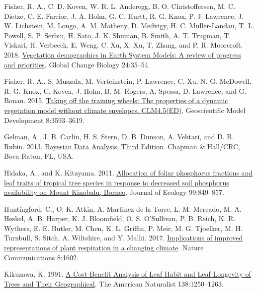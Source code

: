 \documentclass[
  12pt,
  letterpaper,
  DIV=11,
  numbers=noendperiod]{scrartcl}
\newlength{\cslhangindent}
\newlength{\cslentryspacingunit} %
\newenvironment{CSLReferences}[2] %
 {%
  \setlength{\parindent}{0pt}
  \ifodd #1
  \let\oldpar\par
  \def\par{\hangindent=\cslhangindent\oldpar}
  \fi
  \setlength{\parskip}{#2\cslentryspacingunit}
 }%
 {}
\begin{document}
\begin{CSLReferences}{1}{0}
\leavevmode{}%
Fisher, R. A., C. D. Koven, W. R. L. Anderegg, B. O. Christoffersen, M.
C. Dietze, C. E. Farrior, J. A. Holm, G. C. Hurtt, R. G. Knox, P. J.
Lawrence, J. W. Lichstein, M. Longo, A. M. Matheny, D. Medvigy, H. C.
Muller-Landau, T. L. Powell, S. P. Serbin, H. Sato, J. K. Shuman, B.
Smith, A. T. Trugman, T. Viskari, H. Verbeeck, E. Weng, C. Xu, X. Xu, T.
Zhang, and P. R. Moorcroft. 2018.
\href{https://doi.org/10.1111/gcb.13910}{Vegetation demographics in
{Earth System Models}: {A} review of progress and priorities}. Global
Change Biology 24:35--54.

\leavevmode{}%
Fisher, R. A., S. Muszala, M. Verteinstein, P. Lawrence, C. Xu, N. G.
McDowell, R. G. Knox, C. Koven, J. Holm, B. M. Rogers, A. Spessa, D.
Lawrence, and G. Bonan. 2015.
\href{https://doi.org/10.5194/gmd-8-3593-2015}{Taking off the training
wheels: The properties of a dynamic vegetation model without climate
envelopes, {CLM4}.5({ED})}. Geoscientific Model Development
8:3593--3619.

\leavevmode{}%
Gelman, A., J. B. Carlin, H. S. Stern, D. B. Dunson, A. Vehtari, and D.
B. Rubin. 2013.
\href{https://books.google.com.pa/books?id=eSHSBQAAQBAJ}{Bayesian {Data
Analysis}, {Third Edition}}. {Chapman \& Hall/CRC}, {Boca Raton, FL,
USA.}

\leavevmode{}%
Hidaka, A., and K. Kitayama. 2011.
\href{https://doi.org/10.1111/j.1365-2745.2011.01805.x}{Allocation of
foliar phosphorus fractions and leaf traits of tropical tree species in
response to decreased soil phosphorus availability on {Mount Kinabalu},
{Borneo}}. Journal of Ecology 99:849--857.

\leavevmode{}%
Huntingford, C., O. K. Atkin, A. Martinez-de la Torre, L. M. Mercado, M.
A. Heskel, A. B. Harper, K. J. Bloomfield, O. S. O'Sullivan, P. B.
Reich, K. R. Wythers, E. E. Butler, M. Chen, K. L. Griffin, P. Meir, M.
G. Tjoelker, M. H. Turnbull, S. Sitch, A. Wiltshire, and Y. Malhi. 2017.
\href{https://doi.org/10.1038/s41467-017-01774-z}{Implications of
improved representations of plant respiration in a changing climate}.
Nature Communications 8:1602.

\leavevmode{}%
Kikuzawa, K. 1991. \href{https://doi.org/10.2307/2462519}{A
{Cost-Benefit Analysis} of {Leaf Habit} and {Leaf Longevity} of {Trees}
and {Their Geographical}}. The American Naturalist 138:1250--1263.


\end{CSLReferences}
\end{document}
